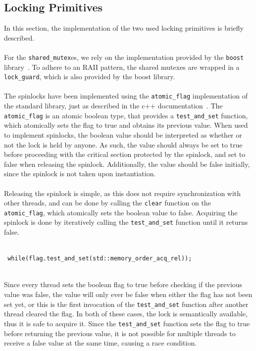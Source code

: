\documentclass[11pt]{report} %
\begin{document}
\subsection{Locking Primitives}
\label{subsec:implementation_locking_primitives}
In this section, the implementation of the two used locking primitives is briefly described.\\
\\
For the \verb|shared_mutex|es, we rely on the implementation provided by the \verb|boost| library~\cite{boost_shared_mutex}. To adhere to an RAII pattern, the shared mutexes are wrapped in a \verb|lock_guard|, which is also provided by the boost library. \\
\\
The spinlocks have been implemented using the \verb|atomic_flag| implementation of the standard library, just as described in the c++ documentation~\cite{atomic_flag}. The \verb|atomic_flag| is an atomic boolean type, that provides a \verb|test_and_set| function, which atomically sets the flag to true and obtains its previous value. When used to implement spinlocks, the boolean value should be interpreted as whether or not the lock is held by anyone. As such, the value should always be set to true before proceeding with the critical section protected by the spinlock, and set to false when releasing the spinlock. Additionally, the value should be false initially, since the spinlock is not taken upon instantiation.\\
\\
Releasing the spinlock is simple, as this does not require synchronization with other threads, and can be done by calling the \verb|clear| function on the \verb|atomic_flag|, which atomically sets the boolean value to false. Acquiring the spinlock is done by iteratively calling the \verb|test_and_set| function until it returns false. \\
\\
\begin{fminipage}{\textwidth}
\begin{lstlisting}
 while(flag.test_and_set(std::memory_order_acq_rel));
\end{lstlisting}
\end{fminipage}
\vphantom{fill}\\
Since every thread sets the boolean flag to true before checking if the previous value was false, the value will only ever be false when either the flag has not been set yet, or this is the first invocation of the \verb|test_and_set| function after another thread cleared the flag. In both of these cases, the lock is semantically available, thus it is safe to acquire it. Since the \verb|test_and_set| function sets the flag to true before returning the previous value, it is not possible for multiple threads to receive a false value at the same time, causing a race condition.\\
\end{document}
